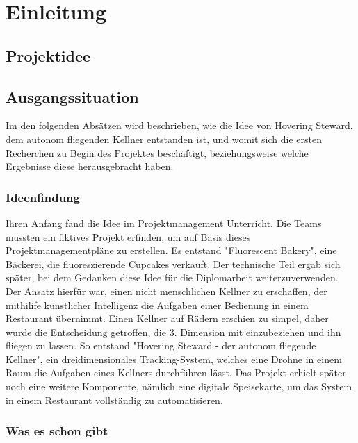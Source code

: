 \chapter{Einleitung}
\renewcommand{\kapitelautor}{Autor: Markus Kaiser}

\section{Projektidee}

\section{Ausgangssituation}
  Im den folgenden Absätzen wird beschrieben, wie die Idee von Hovering Steward, dem autonom fliegenden Kellner
  entstanden ist, und womit sich die ersten Recherchen zu Begin des Projektes beschäftigt, beziehungsweise
  welche Ergebnisse diese herausgebracht haben.

  \subsection{Ideenfindung}
  Ihren Anfang fand die Idee im Projektmanagement Unterricht. Die Teams mussten ein fiktives Projekt erfinden, um auf Basis dieses
  Projektmanagementpläne zu erstellen. Es entstand "Fluorescent Bakery", eine Bäckerei, die fluoreszierende Cupcakes verkauft.
  Der technische Teil ergab sich später, bei dem Gedanken diese Idee für die Diplomarbeit weiterzuverwenden. Der Ansatz hierfür war,
  einen nicht menschlichen Kellner zu erschaffen, der mithilife künstlicher Intelligenz die Aufgaben einer Bedienung in einem Restaurant übernimmt.
  Einen Kellner auf Rädern erschien zu simpel, daher wurde die Entscheidung getroffen, die 3. Dimension mit einzubeziehen und ihn fliegen zu lassen.
  So entstand "Hovering Steward - der autonom fliegende Kellner", ein dreidimensionales Tracking-System, welches eine Drohne in einem Raum die Aufgaben eines Kellners durchführen lässt.
  Das Projekt erhielt später noch eine weitere Komponente, nämlich eine digitale Speisekarte, um das System in einem Restaurant vollständig zu automatisieren.

  \subsection{Was es schon gibt}


